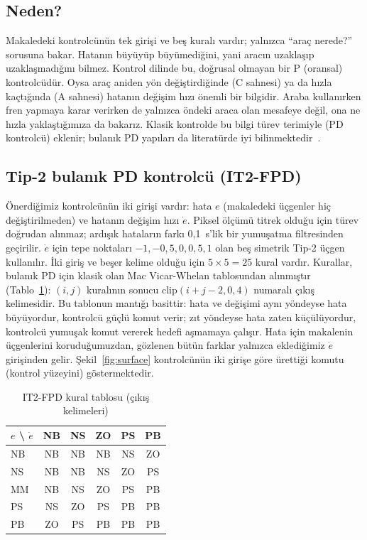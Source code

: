 \documentclass[conference,a4paper]{IEEEtran}
\begin{document}
\subsection{Neden?}
Makaledeki kontrolcünün tek girişi ve beş kuralı vardır; yalnızca ``araç nerede?'' sorusuna bakar. Hatanın büyüyüp büyümediğini, yani aracın uzaklaşıp uzaklaşmadığını bilmez. Kontrol dilinde bu, doğrusal olmayan bir P (oransal) kontrolcüdür. Oysa araç aniden yön değiştirdiğinde (C sahnesi) ya da hızla kaçtığında (A sahnesi) hatanın değişim hızı önemli bir bilgidir. Araba kullanırken fren yapmaya karar verirken de yalnızca öndeki araca olan mesafeye değil, ona ne hızla yaklaştığımıza da bakarız. Klasik kontrolde bu bilgi türev terimiyle (PD kontrolcü) eklenir; bulanık PD yapıları da literatürde iyi bilinmektedir~\cite{macvicar1976,kumbasar2014,sarabakha2018}.

\subsection{Tip-2 bulanık PD kontrolcü (IT2-FPD)}
Önerdiğimiz kontrolcünün iki girişi vardır: hata $e$ (makaledeki üçgenler hiç değiştirilmeden) ve hatanın değişim hızı $\dot e$. Piksel ölçümü titrek olduğu için türev doğrudan alınmaz; ardışık hataların farkı 0,1~s'lik bir yumuşatma filtresinden geçirilir. $\dot e$ için tepe noktaları $-1,-0{,}5,0,0{,}5,1$ olan beş simetrik Tip-2 üçgen kullanılır. İki giriş ve beşer kelime olduğu için $5\times5=25$ kural vardır. Kurallar, bulanık PD için klasik olan Mac Vicar-Whelan tablosundan alınmıştır~\cite{macvicar1976} (Tablo~\ref{tab:rules}): $(i,j)$ kuralının sonucu $\text{clip}(i+j-2,0,4)$ numaralı çıkış kelimesidir. Bu tablonun mantığı basittir: hata ve değişimi aynı yöndeyse hata büyüyordur, kontrolcü güçlü komut verir; zıt yöndeyse hata zaten küçülüyordur, kontrolcü yumuşak komut vererek hedefi aşmamaya çalışır. Hata için makalenin üçgenlerini koruduğumuzdan, gözlenen bütün farklar yalnızca eklediğimiz $\dot e$ girişinden gelir. Şekil~\ref{fig:surface} kontrolcünün iki girişe göre ürettiği komutu (kontrol yüzeyini) göstermektedir.

\begin{table}[t]
\centering
\caption{IT2-FPD kural tablosu (çıkış kelimeleri)}
\label{tab:rules}
\footnotesize
\begin{tabular}{@{}lccccc@{}}
\toprule
$e$ \textbackslash{} $\dot e$ & NB & NS & ZO & PS & PB \\
\midrule
NB & NB & NB & NB & NS & ZO \\
NS & NB & NB & NS & ZO & PS \\
MM & NB & NS & ZO & PS & PB \\
PS & NS & ZO & PS & PB & PB \\
PB & ZO & PS & PB & PB & PB \\
\bottomrule
\end{tabular}
\end{table}
\end{document}
